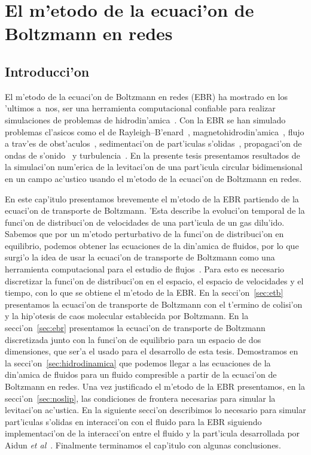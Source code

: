 
\chapter{El m'etodo de la  ecuaci'on de Boltzmann en redes}





\section{Introducci'on}
El m'etodo de la ecuaci'on de Boltzmann en redes (EBR) ha mostrado en los 'ultimos a~nos, ser una herramienta
computacional confiable para realizar simulaciones de problemas de hidrodin'amica~\cite{suc97a,suc01}. 
Con la EBR se han simulado problemas cl'asicos como el de Rayleigh--B'enard~\cite{shan97,inamuro02}, 
magnetohidrodin'amica~\cite{che91}, flujo a trav'es de obst'aculos~\cite{koch97,li04}, sedimentaci'on de part'iculas 
s'olidas~\cite{ladd94,aidun03,ding03b}, propagaci'on de ondas de s'onido~\cite{buick98,buick00}
y  turbulencia~\cite{lockard02}. 
En la presente tesis presentamos resultados de la simulaci'on num'erica de la levitaci'on de una
part'icula circular bidimensional en un campo ac'ustico usando el m'etodo de la ecuaci'on de Boltzmann en
redes.


En este cap'itulo presentamos  brevemente el m'etodo de la EBR partiendo de la ecuaci'on
de transporte de Boltzmann. 'Esta describe la evoluci'on temporal de la funci'on de distribuci'on
de velocidades de una part'icula de un gas dilu'ido. Sabemos que por un m'etodo
perturbativo de la funci'on de distribuci'on en equilibrio, podemos obtener las ecuaciones
de la din'amica de fluidos, por lo que surgi'o la idea de usar la ecuaci'on de transporte
de Boltzmann como una herramienta computacional para el estudio de flujos~\cite{bol98,mcn88,higuera89a}. 
Para esto es necesario discretizar la funci'on de distribuci'on en el espacio, el espacio de velocidades
y el tiempo, con lo que se obtiene el m'etodo de la EBR.
En la secci'on~\ref{sec:etb} presentamos la ecuaci'on de transporte de Boltzmann con el
t'ermino de colisi'on y la hip'otesis de caos molecular establecida por Boltzmann.
En la secci'on~\ref{sec:ebr} presentamos la ecuaci'on
de transporte de Boltzmann discretizada junto con la funci'on de equilibrio para un
espacio de dos dimensiones, que ser'a el usado para el desarrollo de esta tesis.
Demostramos en la secci'on~\ref{sec:hidrodinamica} que podemos llegar a las ecuaciones de la din'amica de fluidos 
para un fluido compresible  a partir de la ecuaci'on de Boltzmann en redes.
Una vez justificado el m'etodo de la EBR presentamos, en la secci'on~\ref{sec:noslip},    las condiciones de frontera
necesarias para simular la levitaci'on ac'ustica. En la siguiente secci'on
describimos lo necesario para simular part'iculas s'olidas en interacci'on con el fluido para la
EBR siguiendo implementaci'on de la interacci'on entre el fluido y la part'icula desarrollada  
por Aidun {\it et al}~\cite{aidun98}.  Finalmente terminamos el cap'itulo con algunas conclusiones.


